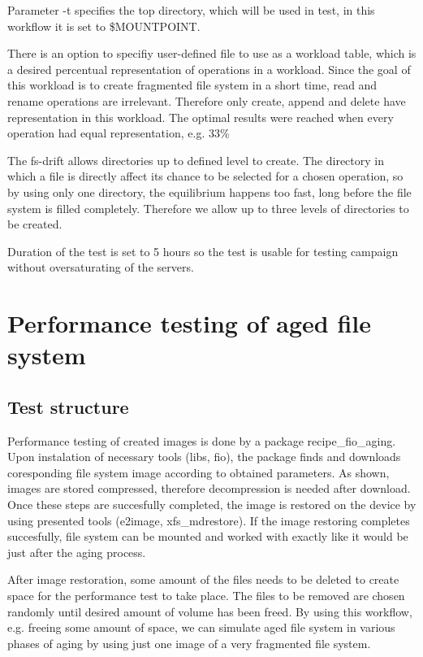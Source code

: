 \documentclass[
  color, %
  table, %
  lof,   %
  lot,   %
]{fithesis3}
\begin{document}
Parameter -t specifies the top directory, which will be used in test, in this workflow it is set to \$MOUNTPOINT.

There is an option to specifiy user-defined file to use as a workload table, which is a desired percentual representation of operations in a workload. Since the goal of this workload is to create fragmented file system in a short time, read and rename operations are irrelevant. Therefore only create, append and delete have representation in this workload. The optimal results were reached when every operation had equal representation, e.g. 33\%

The fs-drift allows directories up to defined level to create. The directory in which a file is directly affect its chance to be selected for a chosen operation, so by using only one directory, the equilibrium happens too fast, long before the file system is filled completely. Therefore we allow up to three levels of directories to be created.

Duration of the test is set to 5 hours so the test is usable for testing campaign without oversaturating of the servers.

\chapter{Performance testing of aged file system}

\section{Test structure}
Performance testing of created images is done by a package recipe\_fio\_aging. Upon instalation of necessary tools (libs, fio), the package finds and downloads coresponding file system image according to obtained parameters. As shown, images are stored compressed, therefore decompression is needed after download. Once these steps are succesfully completed, the image is restored on the device by using presented tools (e2image, xfs\_mdrestore). If the image restoring completes succesfully, file system can be mounted and worked with exactly like it would be just after the aging process.

After image restoration, some amount of the files needs to be deleted to create space for the performance test to take place. The files to be removed are chosen randomly until desired amount of volume has been freed. By using this workflow, e.g. freeing some amount of space, we can simulate aged file system in various phases of aging by using just one image of a very fragmented file system.
\end{document}
